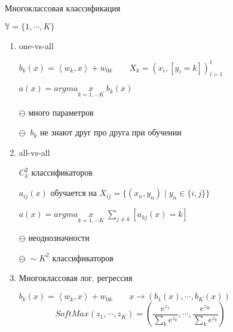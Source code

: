 \documentclass[final]{beamer}
\newlength{\sepwidth}
\newlength{\colwidth}
\newcommand{\separatorcolumn}{\begin{column}{\sepwidth}\end{column}}
\begin{document}
\begin{frame}[t]
\begin{columns}[t]
\begin{column}{\colwidth}
\begin{block}{Многоклассовая классификация}

$\mathbb{Y} = \{ 1, \cdots, K\}$
\begin{enumerate}
    \item one-vs-all

$b_k(x) = \left< w_k, x \right> + w_{0k} \quad \quad X_k = ( x_i, [y_i = k] )_{i = 1}^{\ell}$

$a(x) = argmax \limits_{k = 1, \cdots K} \; b_k(x)$

$\ominus$ {\small много параметров}

$\ominus \; \; b_k$ {\small не знают друг про друга при обучении}

    \item all-vs-all

$C_k^2$ {\small классификаторов}

$a_{ij}(x)$ {\small обучается на } $X_{ij} = \{ (x_n, y_n) \; | \; y_n \in \{i, j\}\}$ 

$a(x) = argmax \limits_{k = 1, \cdots K} \; \sum\limits_{j \ne k} [a_{kj}(x) = k]$

$\ominus$ {\small неоднозначности}

$\ominus \;  \sim K^2$ {\small классификаторов}

    \item {\small Многоклассовая лог. регрессия}

$b_k(x) = \left< w_k, x \right> + w_{0k} \quad \quad  x \to (b_1(x), \cdots, b_K(x))$
\[SoftMax(z_1, \cdots, z_K) = \left( \frac{e^{z_1}}{\sum\limits_{k} e^{z_k}} , \cdots , \frac{e^{z_K}}{\sum\limits_{k} e^{z_k}} \right)\]
\end{enumerate}
\end{block}
\end{column}
\separatorcolumn
\end{columns}
\end{frame}
\end{document}
